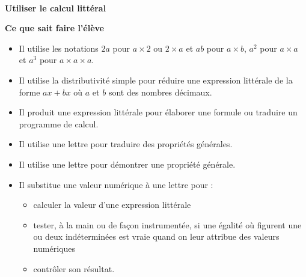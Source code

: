 \documentclass[10pt]{article}
\newcommand{\RR}{\begin{tikzpicture} \draw[Bleu,fill=Bleu] (0,0) circle (0.06); \end{tikzpicture}}
\newcommand{\competence}[1]{\par\color{Bleu}\makebox[\linewidth]{\rule{\textwidth}{2pt}}\\{\bfseries\Large#1}\color{black}\vspace{1em}}
\newenvironment{savoireleves}{%
    \renewcommand{\labelitemi}{\RR}%
    \color{black}%
    \par\textbf{Ce que sait faire l'élève}
    \begin{itemize}
    \setlength{\itemsep}{-0.2em}%
}{
    \end{itemize}
}
\newenvironment{sousitemize}{
    \color{black}%
    \vspace{-1em}%
    \begin{itemize}
    \setlength{\itemsep}{0em}%
}{
    \end{itemize}
}
\begin{document}
    \competence{Utiliser le calcul littéral}
    \begin{savoireleves}
        \item Il utilise les notations $2a$ pour $a \times 2$ ou $2 \times a$ et $ab$ pour $a × b$, $a^2$ pour $a \times a$ et $a^3$ pour $a \times a \times a$.
        \item Il utilise la distributivité simple pour réduire une expression littérale de la forme $ax + bx$ où $a$ et $b$ sont des nombres décimaux.
        \item Il produit une expression littérale pour élaborer une formule ou traduire un programme de calcul.
        \item Il utilise une lettre pour traduire des propriétés générales.
        \item Il utilise une lettre pour démontrer une propriété générale.
        \item Il substitue une valeur numérique à une lettre pour :
        \begin{sousitemize}
            \item calculer la valeur d’une expression littérale 
            \item tester, à la main ou de façon instrumentée, si une égalité où figurent une ou deux indéterminées est vraie quand on leur attribue des valeurs numériques 
            \item contrôler son résultat.
        \end{sousitemize}
    \end{savoireleves}
\end{document}
